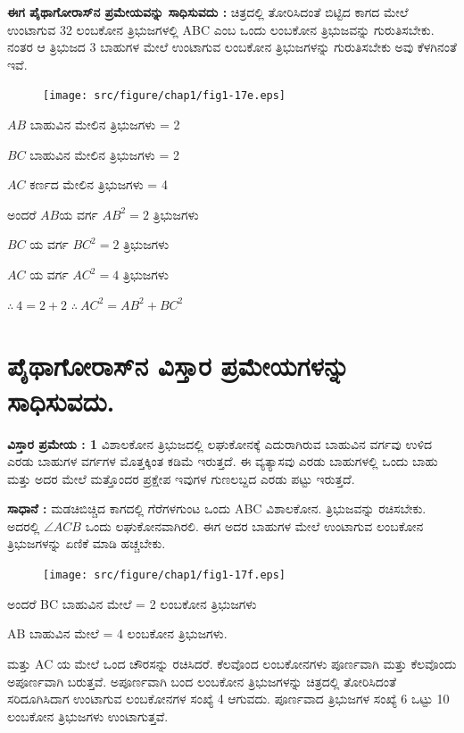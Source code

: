 \medskip

\noindent
\textbf{ಈಗ ಪೈಥಾಗೋರಾಸ್‌ನ ಪ್ರಮೇಯವನ್ನು ಸಾಧಿಸುವದು :} ಚಿತ್ರದಲ್ಲಿ ತೋರಿಸಿದಂತೆ ಬಿಟ್ಟಿದ ಕಾಗದ ಮೇಲೆ ಉಂಟಾಗುವ 32 ಲಂಬಕೋನ ತ್ರಿಭುಜಗಳಲ್ಲಿ ABC ಎಂಬ ಒಂದು ಲಂಬಕೋನ ತ್ರಿಭುಜವನ್ನು ಗುರುತಿಸಬೇಕು. ನಂತರ ಆ ತ್ರಿಭುಜದ 3 ಬಾಹುಗಳ ಮೇಲೆ ಉಂಟಾಗುವ ಲಂಬಕೋನ ತ್ರಿಭುಜಗಳನ್ನು ಗುರುತಿಸಬೇಕು ಅವು ಕೆಳಗಿನಂತೆ ಇವೆ. 
\begin{figure}[H]
\centering
\texttt{[image: src/figure/chap1/fig1-17e.eps]}
\end{figure} 

$AB$ ಬಾಹುವಿನ ಮೇಲಿನ ತ್ರಿಭುಜಗಳು = 2 

\smallskip

$BC$ ಬಾಹುವಿನ ಮೇಲಿನ ತ್ರಿಭುಜಗಳು  = 2

\smallskip

$AC$ ಕರ್ಣದ ಮೇಲಿನ ತ್ರಿಭುಜಗಳು = 4
\smallskip

ಅಂದರೆ  $AB$ಯ ವರ್ಗ $AB^2 =2 $ ತ್ರಿಭುಜಗಳು 

\smallskip
$BC$ ಯ ವರ್ಗ $BC^2 = 2 $  ತ್ರಿಭುಜಗಳು

\smallskip
$AC$ ಯ ವರ್ಗ $AC^2 = 4$  ತ್ರಿಭುಜಗಳು

\smallskip
$\therefore ~ 4 = 2+2$ \quad $\therefore ~ AC^2 = AB^2 + BC^2$


\section*{ಪೈಥಾಗೋರಾಸ್‌ನ ವಿಸ್ತಾರ ಪ್ರಮೇಯಗಳನ್ನು ಸಾಧಿಸುವದು.}

\noindent
\textbf{ವಿಸ್ತಾರ ಪ್ರಮೇಯ : 1} ವಿಶಾಲಕೋನ ತ್ರಿಭುಜದಲ್ಲಿ ಲಘುಕೋನಕ್ಕೆ ಎದುರಾಗಿರುವ ಬಾಹುವಿನ ವರ್ಗವು ಉಳಿದ ಎರಡು ಬಾಹುಗಳ ವರ್ಗಗಳ ಮೊತ್ತಕ್ಕಿಂತ ಕಡಿಮೆ ಇರುತ್ತದೆ. ಈ ವ್ಯತ್ಯಾಸವು ಎರಡು ಬಾಹುಗಳಲ್ಲಿ ಒಂದು ಬಾಹು ಮತ್ತು ಅದರ ಮೇಲೆ ಮತ್ತೊಂದರ ಪ್ರಕ್ಷೇಪ ಇವುಗಳ ಗುಣಲಬ್ದದ ಎರಡು ಪಟ್ಟು ಇರುತ್ತದೆ. 

\noindent
\textbf{ಸಾಧಾನೆ :} ಮಡಚಿಬಿಚ್ಚಿದ ಕಾಗದಲ್ಲಿ ಗೆರೆಗಳಗುಂಟ ಒಂದು ABC ವಿಶಾಲಕೋನ. ತ್ರಿಭುಜವನ್ನು ರಚಿಸಬೇಕು. ಅದರಲ್ಲಿ $\angle ACB$ ಒಂದು ಲಘುಕೋನವಾಗಿರಲಿ. ಈಗ ಅದರ ಬಾಹುಗಳ ಮೇಲೆ ಉಂಟಾಗುವ ಲಂಬಕೋನ ತ್ರಿಭುಜಗಳನ್ನು ಏಣಿಕೆ ಮಾಡಿ ಹಚ್ಚಬೇಕು. 
\begin{figure}[H]
\centering
\texttt{[image: src/figure/chap1/fig1-17f.eps]}
\end{figure} 

ಅಂದರೆ BC ಬಾಹುವಿನ ಮೇಲೆ = 2 ಲಂಬಕೋನ  ತ್ರಿಭುಜಗಳು 

AB ಬಾಹುವಿನ ಮೇಲೆ = 4 ಲಂಬಕೋನ ತ್ರಿಭುಜಗಳು. 

ಮತ್ತು AC ಯ ಮೇಲೆ ಒಂದ ಚೌರಸನ್ನು ರಚಿಸಿದರೆ. ಕೆಲವೊಂದ ಲಂಬಕೋನಗಳು ಪೂರ್ಣವಾಗಿ ಮತ್ತು ಕೆಲವೊಂದು ಅಪೂರ್ಣವಾಗಿ ಬರುತ್ತವೆ. ಅಪೂರ್ಣವಾಗಿ ಬಂದ ಲಂಬಕೋನ ತ್ರಿಭುಜಗಳನ್ನು ಚಿತ್ರದಲ್ಲಿ ತೋರಿಸಿದಂತೆ ಸರಿದೂಗಿಸಿದಾಗ ಉಂಟಾಗುವ ಲಂಬಕೋನಗಳ ಸಂಖ್ಯೆ  4 ಆಗುವದು.  ಪೂರ್ಣವಾದ ತ್ರಿಭುಜಗಳ ಸಂಖ್ಯೆ  6 ಒಟ್ಟು 10 ಲಂಬಕೋನ ತ್ರಿಭುಜಗಳು ಉಂಟಾಗುತ್ತವೆ. 

